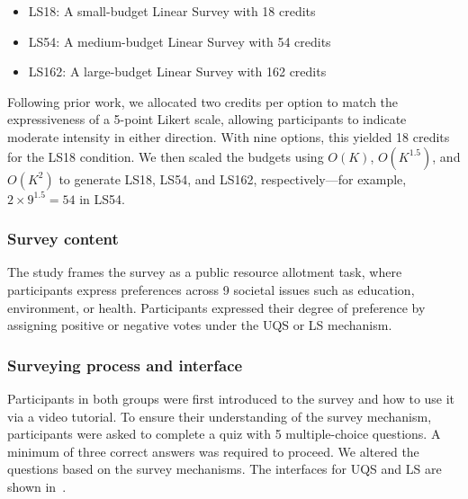 \begin{itemize} 
    \item LS18: A small-budget Linear Survey with 18 credits
    \item LS54: A medium-budget Linear Survey with 54 credits
    \item LS162: A large-budget Linear Survey with 162 credits
\end{itemize}

Following prior work, we allocated two credits per option to match the expressiveness of a 5-point Likert scale, allowing participants to indicate moderate intensity in either direction. With nine options, this yielded 18 credits for the LS18 condition. We then scaled the budgets using $O(K)$, $O(K^{1.5})$, and $O(K^2)$ to generate LS18, LS54, and LS162, respectively—for example, $2 \times 9^{1.5} = 54$ in LS54.

\subsubsection{Survey content}
The study frames the survey as a public resource allotment task, where participants express preferences across 9 societal issues such as education, environment, or health. Participants expressed their degree of preference by assigning positive or negative votes under the UQS or LS mechanism.

\subsubsection{Surveying process and interface}
Participants in both groups were first introduced to the survey and how to use it via a video tutorial. To ensure their understanding of the survey mechanism, participants were asked to complete a quiz with 5 multiple-choice questions. A minimum of three correct answers was required to proceed. We altered the questions based on the survey mechanisms. The interfaces for UQS and LS are shown in~.


